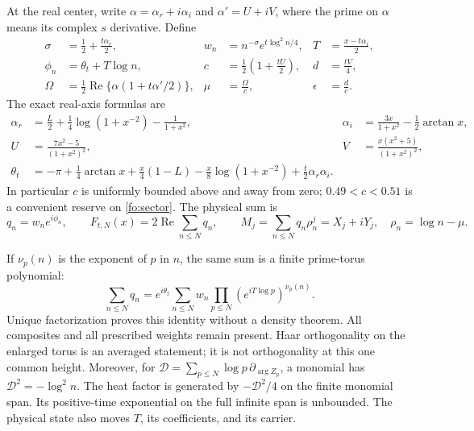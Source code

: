 \documentclass[11pt]{article}
\numberwithin{equation}{section}
\theoremstyle{definition}
\theoremstyle{remark}
\begin{document}
At the real center, write $\alpha=\alpha_r+i\alpha_i$ and
$\alpha'=U+iV$, where the prime on $\alpha$ means its complex
$s$ derivative.  Define
\begin{align}
\sigma&=\frac12+\frac{t\alpha_r}{2},&
w_n&=n^{-\sigma}e^{t\log^2 n/4},&
T&=\frac{x-t\alpha_i}{2},\label{fo:physical-data}\\
\phi_n&=\theta_t+T\log n,&
c&=\frac12\left(1+\frac{tU}{2}\right),&
d&=\frac{tV}{4},\nonumber\\
\Omega&=\frac12\operatorname{Re}\{\alpha(1+t\alpha'/2)\},&
\mu&=\frac{\Omega}{c},&
\epsilon&=\frac dc.\nonumber
\end{align}
The exact real-axis formulas are
\begin{align}
\alpha_r&=\frac L2+\frac14\log(1+x^{-2})-\frac1{1+x^2},&
\alpha_i&=\frac{3x}{1+x^2}-\frac12\arctan x,\label{fo:real-data}\\
U&=\frac{7x^2-5}{(1+x^2)^2},&
V&=\frac{x(x^2+5)}{(1+x^2)^2},\nonumber\\
\theta_t&=-\pi+\frac14\arctan x+\frac x4(1-L)
 -\frac x8\log(1+x^{-2})+\frac t2\alpha_r\alpha_i.\nonumber
\end{align}
In particular $c$ is uniformly bounded above and away from zero;
$0.49<c<0.51$ is a convenient reserve on \eqref{fo:sector}.
The physical sum is
\begin{equation}
q_n=w_ne^{i\phi_n},\qquad F_{t,N}(x)=2\operatorname{Re}\sum_{n\le N}q_n,
\qquad
M_j=\sum_{n\le N}q_n\rho_n^j=X_j+iY_j,\quad
\rho_n=\log n-\mu.
\label{fo:moments}
\end{equation}

If $\nu_p(n)$ is the exponent of $p$ in $n$, the same sum is a finite
prime-torus polynomial:
\begin{equation}
\sum_{n\le N}q_n
 =e^{i\theta_t}\sum_{n\le N}w_n
       \prod_{p\le N}\left(e^{iT\log p}\right)^{\nu_p(n)}.
\label{fo:torus}
\end{equation}
Unique factorization proves this identity without a density theorem.
All composites and all prescribed weights remain present.  Haar
orthogonality on the enlarged torus is an averaged statement; it is not
orthogonality at this one common height.  Moreover, for
$\mathcal D=\sum_{p\le N}\log p\,\partial_{\arg Z_p}$,
a monomial has $\mathcal D^2=-\log^2 n$.  The heat factor is generated
by $-\mathcal D^2/4$ on the finite monomial span.  Its positive-time
exponential on the full infinite span is unbounded.  The physical state
also moves $T$, its coefficients, and its carrier.
\end{document}
